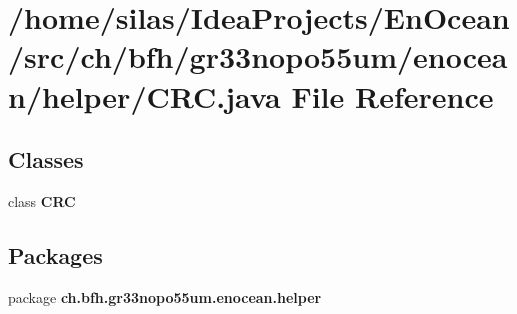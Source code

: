 \section{/home/silas/\+Idea\+Projects/\+En\+Ocean/src/ch/bfh/gr33nopo55um/enocean/helper/\+C\+RC.java File Reference}
\label{CRC_8java}
\subsection*{Classes}
\begin{DoxyCompactItemize}
\item 
class {\bf C\+RC}
\end{DoxyCompactItemize}
\subsection*{Packages}
\begin{DoxyCompactItemize}
\item 
package {\bf ch.\+bfh.\+gr33nopo55um.\+enocean.\+helper}
\end{DoxyCompactItemize}
